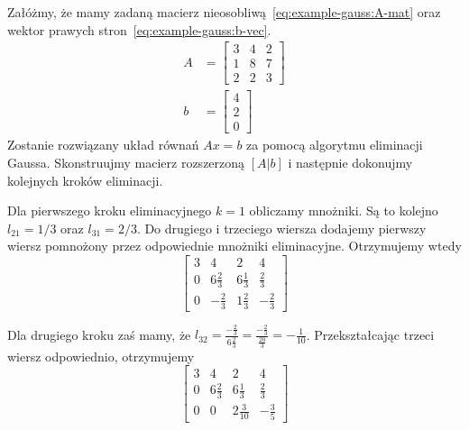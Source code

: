 \documentclass[../main.tex]{subfiles}
\begin{document}
    \begin{example} \label{ex:gauss-elim}
      Załóżmy, że mamy zadaną macierz nieosobliwą~\ref{eq:example-gauss:A-mat}
      oraz wektor prawych stron~\ref{eq:example-gauss:b-vec}.
      \begin{align}
        A &= \begin{bmatrix} \label{eq:example-gauss:A-mat} 
          3 & 4 & 2 \\
          1 & 8 & 7 \\
          2 & 2 & 3
        \end{bmatrix} \\
        b &= \begin{bmatrix} \label{eq:example-gauss:b-vec}
          4 \\
          2 \\
          0
        \end{bmatrix}
      \end{align}
      Zostanie rozwiązany układ równań \( Ax = b \) za pomocą algorytmu eliminacji
      Gaussa. Skonstruujmy macierz rozszerzoną \( [A | b] \) i następnie dokonujmy
      kolejnych kroków eliminacji.

      Dla pierwszego kroku eliminacyjnego \( k = 1 \) obliczamy mnożniki.
      Są to kolejno \( l_{21} = 1 / 3 \) oraz \( l_{31} = 2 / 3 \).
      Do drugiego i trzeciego wiersza dodajemy pierwszy wiersz pomnożony
      przez odpowiednie mnożniki eliminacyjne. Otrzymujemy wtedy
      \begin{equation*}
        \left[ \begin{array}{ccc|c}
          3 & 4             & 2             & 4             \\
          0 & 6\frac{2}{3}  & 6\frac{1}{3}  & \frac{2}{3}   \\
          0 & -\frac{2}{3}  & 1\frac{2}{3}  & -\frac{2}{3}
        \end{array}\right]
      \end{equation*}

      Dla drugiego kroku zaś mamy, że \( l_{32} = \frac{-\frac{2}{3}}{6\frac{2}{3}} 
      = \frac{-\frac{2}{3}}{\frac{20}{3}} = -\frac{1}{10} \). Przekształcając
      trzeci wiersz odpowiednio, otrzymujemy
      \begin{equation*}
        \left[ \begin{array}{ccc|c}
          3 & 4             & 2             & 4             \\
          0 & 6\frac{2}{3}  & 6\frac{1}{3}  & \frac{2}{3}   \\
          0 & 0             & 2\frac{3}{10} & -\frac{3}{5}
        \end{array}\right]
      \end{equation*}
      

\end{example}
\end{document}
